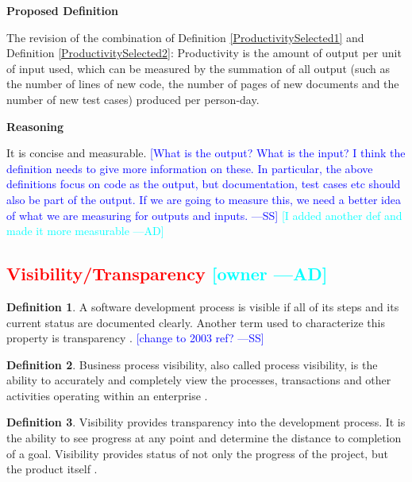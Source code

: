 \documentclass[letterpaper, cleveref]{lipics-v2019}
\newcommand{\authornote}[3]{\textcolor{#1}{[#3 ---#2]}}
\newcommand{\authornote}[3]{}
\newcommand{\wss}[1]{\authornote{blue}{SS}{#1}} %
\newcommand{\ad}[1]{\authornote{cyan}{AD}{#1}} %
\newcommand{\notdone}[1]{\textcolor{red}{#1}}
\theoremstyle{definition}
\newtheorem{defn}{Definition}
\begin{document}
\noindent \textbf{Proposed Definition}

The revision of the combination of Definition \ref{ProductivitySelected1}
and Definition \ref{ProductivitySelected2}: Productivity is the amount of
output per unit of input used, which can be measured by the summation of all
output (such as the number of lines of new code, the number of pages of new
documents and the number of new test cases) produced per person-day.

\noindent \textbf{Reasoning}

It is concise and measurable. \wss{What is the output?  What is the input?
I think the definition needs to give more information on these.  In
particular, the above definitions focus on code as the output, but
documentation, test cases etc should also be part of the output.  If we are
going to measure this, we need a better idea of what we are measuring for
outputs and inputs.} \ad{I added another def and made it more measurable}


\subsection{\notdone{Visibility/Transparency} \ad{owner}}

\begin{defn}
  \label{VisibilitySelected} A software development process is visible if
  all of its steps and its current status are documented clearly. Another
  term used to characterize this property is transparency
  \citep{ghezzi1991fundamentals}. \wss{change to 2003 ref?}
\end{defn}

\begin{defn}
  Business process visibility, also called process visibility, is the ability to
  accurately and completely view the processes, transactions and other
  activities operating within an enterprise \citep{Rouse2013}.
\end{defn}

\begin{defn}
  Visibility provides transparency into the development process. It is the
  ability to see progress at any point and determine the distance to completion
  of a goal.  Visibility provides status of not only the progress of the
  project, but the product itself \citep{GSA2019}.
\end{defn}
\end{document}
